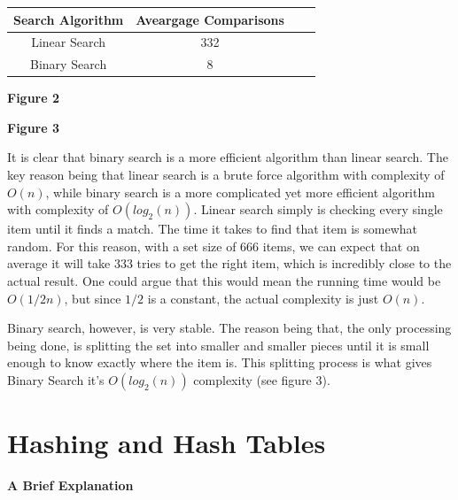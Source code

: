 \documentclass[letterpaper, 10pt]{article}
\begin{document}
\begin{center}
{
 \begin{tabular}{||c c c c||} 
 \hline
 Search Algorithm & Aveargage Comparisons \\ [0.5ex] 
 \hline\hline
 Linear Search& 332 \\ 
 \hline
 Binary Search& 8 \\
 \hline
\end{tabular}
}
\textbf{Figure 2}
\end{center}
\begin{center}
\textbf{Figure 3}
\end{center}




It is clear that binary search is a more efficient algorithm than linear search. The key reason being that linear search is a brute force algorithm with complexity of $O(n)$, while binary search is a more complicated yet more efficient algorithm with complexity of $O(log_2(n))$. Linear search simply is checking every single item until it finds a match. The time it takes to find that item is somewhat random. For this reason, with a set size of 666 items, we can expect that on average it will take 333 tries  to get the right item, which is incredibly close to the actual result. One could argue that this would mean the running time would be $O(1/2n)$, but since $1/2$ is a constant, the actual complexity is just $O(n)$.

Binary search, however, is very stable. The reason being that, the only processing being done, is splitting the set into smaller and smaller pieces until it is small enough to know exactly where the item is. This splitting process is what gives Binary Search it's $O(log_2(n))$ complexity (see figure 3). 

\section{Hashing and Hash Tables}
\begin{center}
\textbf{ A Brief Explanation}
\end{center}
\end{document}
